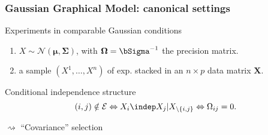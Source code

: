\begin{frame}
  \frametitle{Gaussian Graphical Model: canonical settings}

  \begin{block}{Experiments in comparable Gaussian conditions}
    \begin{enumerate}
    \item  $X\sim\mathcal{N}(\boldsymbol\mu,\boldsymbol\Sigma)$,  with
      $\boldsymbol\Omega = \bSigma^{-1}$ the precision matrix.
    \item a sample $(X^1, \dots, X^n)$ of exp. stacked in an $n\times
      p$ data matrix $\mathbf{X}$.
    \end{enumerate}
  \end{block}

  \vspace{-.5cm}

  \begin{overlayarea}{\textwidth}{\textheight}
    \begin{block}{Conditional independence structure}
          \vspace{-.5cm}
          \begin{equation*}
            (i,j)  \notin  \mathcal{E}  \Leftrightarrow  X_i  \indep  X_j  |
            X_{\backslash \{i,j\}} \Leftrightarrow \Omega_{ij} = 0.
          \end{equation*}
        \end{block}
        
        \vspace{-.5cm}
        \vspace{-1cm}
        $\rightsquigarrow$ \alert{``Covariance'' selection}
   
  \end{overlayarea}      
\end{frame}

